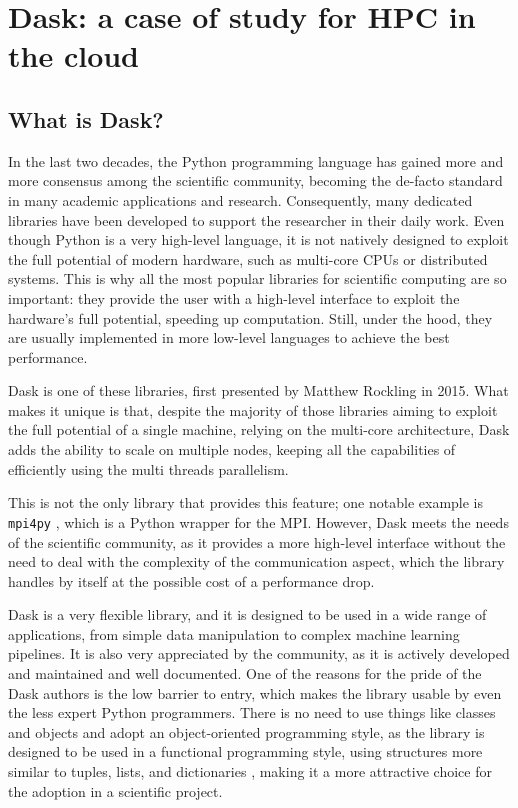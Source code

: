 \chapter{Dask: a case of study for HPC in the cloud}\label{chpt:dask}


\section{What is Dask?}\label{sec:daskintro}

In the last two decades, the Python programming language has gained more and
more consensus among the scientific community, becoming the de-facto standard in
many academic applications and research.
Consequently, many dedicated libraries have been developed to support the
researcher in their daily work.
Even though Python is a very high-level language, it is not natively designed to
exploit the full potential of modern hardware, such as multi-core CPUs or
distributed systems. This is why all the most popular libraries for scientific
computing are so important: they provide the user with a high-level interface to
exploit the hardware's full potential, speeding up computation. Still, under the
hood, they are usually implemented in more low-level languages to achieve the
best performance.

Dask \cite{dask2015} is one of these libraries, first presented by Matthew
Rockling in 2015. What makes it unique is that, despite the majority of those
libraries aiming to exploit the full potential of a single machine, relying on
the multi-core architecture, Dask adds the ability to scale on multiple nodes,
keeping all the capabilities of efficiently using the multi threads parallelism.

This is not the only library that provides this feature; one notable example is
\texttt{mpi4py} \cite{Dalcin2021}, which is a Python wrapper for the MPI.
However, Dask meets the needs of the scientific community, as it provides a more
high-level interface without the need to deal with the complexity of the
communication aspect, which the library handles by itself at the possible cost
of a performance drop.

Dask is a very flexible library, and it is designed to be used in a wide range
of applications, from simple data manipulation to complex machine learning
pipelines. It is also very appreciated by the community, as it is actively
developed and maintained and well documented.
One of the reasons for the pride of the Dask authors is the low barrier to
entry, which makes the library usable by even the less expert Python
programmers. There is no need to use things like classes and objects and adopt
an object-oriented programming style, as the library is designed to be used in a
functional programming style, using structures more similar to tuples, lists,
and dictionaries  \cite{dask2015}, making it a more attractive choice for the
adoption in a scientific project.

